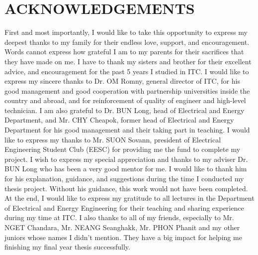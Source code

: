 \section*{\centering ACKNOWLEDGEMENTS}
First and most importantly, I would like to take this opportunity to express my deepest thanks to my family for their endless love, support, and encouragement. Words cannot express how grateful I am to my parents for their sacrifices that they have made on me. I have to thank my sisters and brother for their excellent advice, and encouragement for the past 5 years I studied in ITC.
I would like to express my sincere thanks to Dr. OM Romny, general director of ITC, for his good management and good cooperation with partnership universities inside the country and abroad, and for reinforcement of quality of engineer and high-level technician. I am also grateful to Dr. BUN Long, head of Electrical and Energy Department, and Mr. CHY Cheapok, former head of Electrical and Energy Department for his good management and their taking part in teaching. I would like to express my thanks to Mr. SUON Sovann, president of Electrical Engineering Student Club (EESC) for providing me the fund to complete my project. 
I wish to express my special appreciation and thanks to my adviser Dr. BUN Long who has been a very good mentor for me. I would like to thank him for his explanation, guidance, and suggestions during the time I conducted my thesis project. Without his guidance, this work would not have been completed.
At the end, I would like to express my gratitude to all lectures in the Department of Electrical and Energy Engineering for their teaching and sharing experience during my time at ITC. I also thanks to all of my friends, especially to Mr. NGET Chandara, Mr. NEANG Seanghakk, Mr. PHON Phanit and my other juniors whose names I didn't mention. They have a big impact for helping me finishing my final year thesis successfully.

